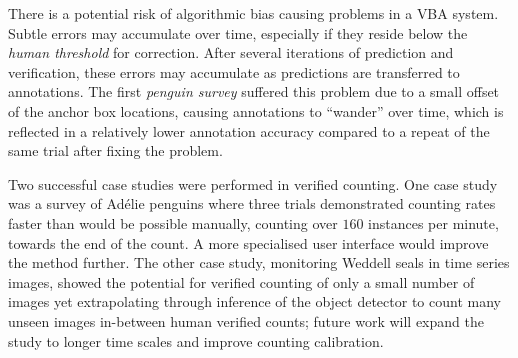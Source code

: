 There is a potential risk of algorithmic bias causing problems in a \gls{VBA} system. Subtle errors may accumulate over time, especially if they reside below the \emph{human threshold} for correction. After several iterations of prediction and verification, these errors may accumulate as predictions are transferred to annotations. The first \emph{penguin survey} suffered this problem due to a small offset of the anchor box locations, causing annotations to ``wander'' over time, which is reflected in a relatively lower annotation accuracy compared to a repeat of the same trial after fixing the problem.

Two successful case studies were performed in verified counting. One case study was a survey of Ad\'elie penguins where three trials demonstrated counting rates faster than would be possible manually, counting over $160$ instances per minute, towards the end of the count. A more specialised user interface would improve the method further. The other case study, monitoring Weddell seals in time series images, showed the potential for verified counting of only a small number of images yet extrapolating through inference of the object detector to count many unseen images in-between human verified counts; future work will expand the study to longer time scales and improve counting calibration.